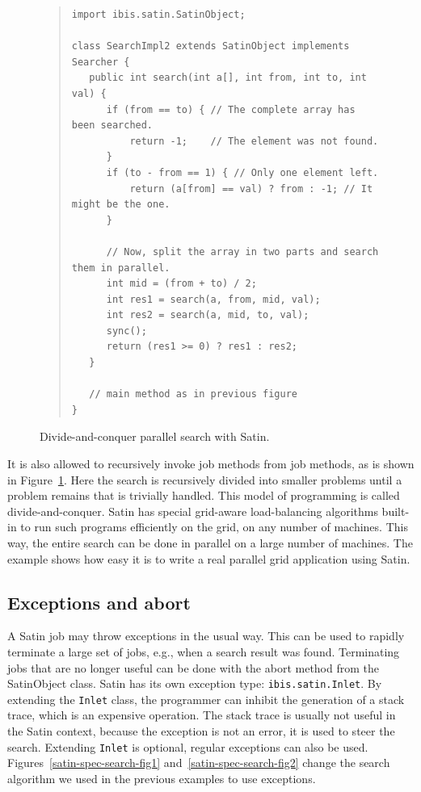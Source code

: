 \documentclass[10pt]{article}
\newcommand{\mysubsection}[1]{\subsection{#1}\label{#1}}
\begin{document}
\begin{figure}[t!]
\small{
\begin{quote}
\begin{verbatim}
import ibis.satin.SatinObject;

class SearchImpl2 extends SatinObject implements Searcher {
   public int search(int a[], int from, int to, int val) {
      if (from == to) { // The complete array has been searched.
          return -1;    // The element was not found.
      }
      if (to - from == 1) { // Only one element left.
          return (a[from] == val) ? from : -1; // It might be the one.
      }

      // Now, split the array in two parts and search them in parallel.
      int mid = (from + to) / 2;
      int res1 = search(a, from, mid, val);
      int res2 = search(a, mid, to, val);
      sync();
      return (res1 >= 0) ? res1 : res2;
   }

   // main method as in previous figure
}
\end{verbatim}
\end{quote}
}
\caption{Divide-and-conquer parallel search with Satin.}
\label{satin-par-search-fig}
\end{figure}

It is also allowed to recursively invoke job methods from job methods,
as is shown in Figure~\ref{satin-par-search-fig}. Here the search is recursively divided into
smaller problems until a problem remains that is trivially
handled. This model of programming is called divide-and-conquer. Satin
has special grid-aware load-balancing algorithms built-in to run such
programs efficiently on the grid, on any number of machines. This way,
the entire search can be done in parallel on a large number of
machines. The example shows how easy it is to write a real parallel
grid application using Satin.  

\mysubsection{Exceptions and abort}

A Satin job may
throw exceptions in the usual way. This can be used to rapidly
terminate a large set of jobs, e.g., when a search result was
found. Terminating jobs that are no longer useful can be done with the
abort method from the SatinObject class.  Satin has its own exception
type: \texttt{ibis.satin.Inlet}.  By extending the \texttt{Inlet} class,
the programmer can inhibit the generation of a stack trace,
which is an expensive operation.
The stack trace is usually not useful in the Satin context,
because the exception is not an error, it is used to steer the
search. Extending \texttt{Inlet} is optional, regular exceptions can also be
used. Figures~\ref{satin-spec-search-fig1} and~\ref{satin-spec-search-fig2} change the search algorithm we used in the previous
examples to use exceptions.
\end{document}
